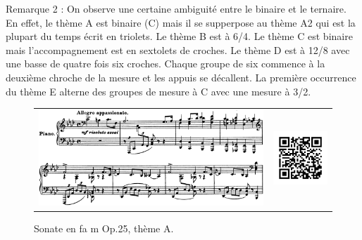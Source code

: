 Remarque 2 : On observe une certaine ambiguité entre le binaire et le ternaire. En effet, le thème A est binaire (C) mais il se supperpose au thème A2 qui est la plupart du temps écrit en triolets. Le thème B est à 6/4. Le thème C est binaire mais l'accompagnement est en sextolets de croches. Le thème D est à 12/8 avec une basse de quatre fois six croches. Chaque groupe de six commence à la deuxième chroche de la mesure et les appuis se décallent. La première occurrence du thème E alterne des groupes de mesure à C avec une mesure à 3/2.\\

\begin{figure}[!p]
  \begin{bigcenter}
    \begin{tabular}{lr}
      \includegraphics[width=12.5cm, keepaspectratio]{sonate-theme-A.png}
      &
      \includegraphics[width=3cm, keepaspectratio]{op1-qr.png}
    \end{tabular}
  \end{bigcenter}
  \caption{\label{sonate-theme-1}Sonate en fa m Op.25, thème A.}
\end{figure}

